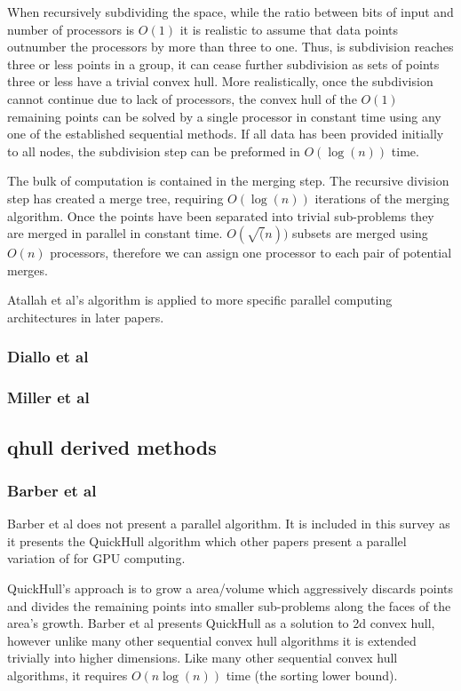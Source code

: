 \documentclass[10pt,a4paper,draft]{report}
\begin{document}
When recursively subdividing the space, while the ratio between bits of input and number of processors is $O(1)$ it is realistic to assume that data points outnumber the processors by more than three to one.
Thus, is subdivision reaches three or less points in a group, it can cease further subdivision as sets of points three or less have a trivial convex hull.
More realistically, once the subdivision cannot continue due to lack of processors, the convex hull of the $O(1)$ remaining points can be solved by a single processor in constant time using any one of the established sequential methods.
If all data has been provided initially to all nodes, the subdivision step can be preformed in $O(\log(n))$ time.


The bulk of computation is contained in the merging step. The recursive division step has created a merge tree, requiring $O(\log(n))$ iterations of the merging algorithm.
Once the points have been separated into trivial sub-problems they are merged in parallel in constant time. $O(\sqrt(n))$ subsets are merged using $O(n)$ processors, therefore we can assign one processor to each pair of potential merges.


Atallah et al's algorithm is applied to more specific parallel computing architectures in later papers.

\subsubsection{Diallo et al}


\subsubsection{Miller et al}

\subsection{qhull derived methods}
\subsubsection{Barber et al}
Barber et al does not present a parallel algorithm. It is included in this survey as it presents the QuickHull algorithm which other papers present a parallel variation of for GPU computing.

QuickHull's approach is to grow a area/volume which aggressively discards points and divides the remaining points into smaller sub-problems along the faces of the area's growth.
Barber et al presents QuickHull as a solution to 2d convex hull, however unlike many other sequential convex hull algorithms it is extended trivially into higher dimensions.
Like many other sequential convex hull algorithms, it requires $O(n\log(n))$ time (the sorting lower bound).
\end{document}

